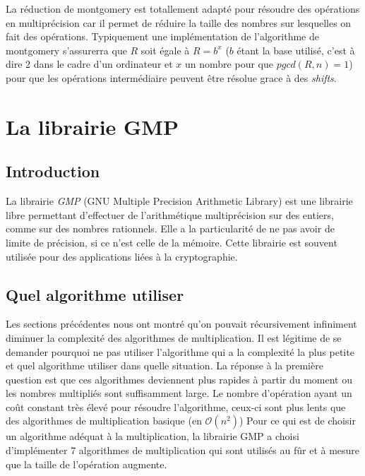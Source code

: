 \documentclass[letterpaper]{article}
\begin{document}
La réduction de montgomery est totallement adapté pour résoudre des opérations
en multiprécision car il permet de réduire la taille des nombres sur lesquelles
on fait des opérations. Typiquement une implémentation de l'algorithme de
montgomery s'assurerra que $R$ soit égale à $R = b^{x}$ ($b$ étant la base utilisé,
c'est à dire 2 dans le cadre d'un ordinateur et $x$ un nombre pour que
$pgcd(R, n) = 1$) pour que les opérations intermédiaire peuvent être résolue
grace à des \emph{shifts}\cite{djguan2003montgomery}.



\section{La librairie GMP}

\subsection{Introduction}

La librairie \emph{GMP} (GNU Multiple Precision Arithmetic Library) est une
librairie libre permettant d'effectuer de l'arithmétique multiprécision sur
des entiers, comme sur des nombres rationnels. Elle a la particularité de ne pas
avoir de limite de précision, si ce n'est celle de la mémoire.
\newline
Cette librairie est souvent utilisée pour des applications liées à la
cryptographie\cite{wikigmp}.

\subsection{Quel algorithme utiliser}

Les sections précédentes nous ont montré qu'on pouvait récursivement
infiniment diminuer la complexité des algorithmes de multiplication.
Il est légitime de se demander pourquoi ne pas utiliser l'algorithme
qui a la complexité la plus petite et quel algorithme utiliser dans
quelle situation.
\newline
La réponse à la première question est que ces algorithmes deviennent
plus rapides à partir du moment ou les nombres multipliés sont
suffisamment large. Le nombre d'opération ayant un coût constant
très élevé pour résoudre l'algorithme, ceux-ci sont plus lents
que des algorithmes de multiplication basique (en $\mathcal{O}(n^2)$)
\newline
Pour ce qui est de choisir un algorithme adéquat à la multiplication,
la librairie GMP a choisi d'implémenter 7 algorithmes de multiplication
qui sont utilisés au fûr et à mesure que la taille de l'opération
augmente\cite{gmplibmultiplication}.
\end{document}
